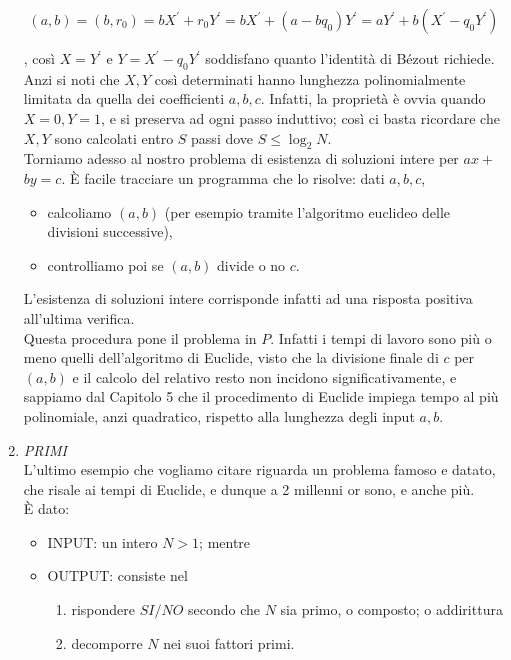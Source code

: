 \begin{enumerate}
          $$(a, b)=\left(b, r_0\right)=b
              X^{\prime}+r_0 Y^{\prime}=b X^{\prime}+\left(a-b q_0\right)
              Y^{\prime}=a Y^{\prime}+b\left(X^{\prime}-q_0 Y^{\prime}\right)
          $$

          , così $X=Y^{\prime}$ e $Y=X^{\prime}-q_0 Y^{\prime}$ soddisfano quanto
          l'identità di Bézout richiede. Anzi si noti che $X, Y$ così
          determinati hanno lunghezza polinomialmente limitata da quella dei
          coefficienti $a, b, c$. Infatti, la proprietà è ovvia quando $X=0,
              Y=1$, e si preserva ad ogni passo induttivo; così ci basta ricordare
          che $X, Y$ sono calcolati entro $S$ passi dove $S \leq \log _2 N$.\\

          Torniamo adesso al nostro problema di esistenza di soluzioni intere
          per $a x+$ $b y=c$. È facile tracciare un programma che lo risolve:
          dati $a, b, c$,

          \begin{itemize}
              \item calcoliamo $(a, b)$ (per esempio tramite l'algoritmo
                    euclideo delle divisioni successive),
              \item controlliamo poi se $(a, b)$ divide o no $c$.
          \end{itemize}

          L'esistenza di soluzioni intere corrisponde infatti ad una risposta
          positiva all'ultima verifica.\\
          Questa procedura pone il problema in
          $P$. Infatti i tempi di lavoro sono più o meno quelli dell'algoritmo
          di Euclide, visto che la divisione finale di $c$ per $(a, b)$ e il
          calcolo del relativo resto non incidono significativamente, e sappiamo
          dal Capitolo 5 che il procedimento di Euclide impiega tempo al più
          polinomiale, anzi quadratico, rispetto alla lunghezza degli input $a,
              b$.
    \item \textit{PRIMI}\\
          L'ultimo esempio che vogliamo citare riguarda un
          problema famoso e datato, che risale ai tempi di Euclide, e dunque a 2
          millenni or sono, e anche più.\\
          È dato:

          \begin{itemize}
              \item INPUT: un intero $N>1$; mentre
              \item OUTPUT: consiste nel
                    \begin{enumerate}[label=(\alph*)]
                        \item rispondere $SI/NO$ secondo che $N$ sia primo, o composto;
                              o addirittura
                        \item decomporre $N$ nei suoi fattori primi.
                    \end{enumerate}


\end{itemize}
\end{enumerate}
